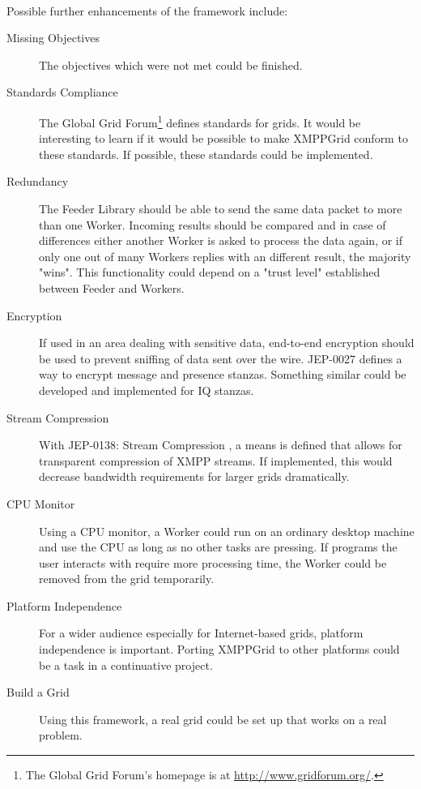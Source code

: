 \paragraph{}
Possible further enhancements of the framework include:
\begin{description}
\item[Missing Objectives] The objectives which were not met could be finished.
\item[Standards Compliance] The Global Grid Forum\footnote{The Global Grid Forum's homepage is at \href{http://www.gridforum.org/}{http://www.gridforum.org/}.} defines standards for grids. It would be interesting to learn if it would be possible to make XMPPGrid conform to these standards. If possible, these standards could be implemented.
\item[Redundancy] The Feeder Library should be able to send the same data packet to more than one Worker. Incoming results should be compared and in case of differences either another Worker is asked to process the data again, or if only one out of many Workers replies with an different result, the majority "wins". This functionality could depend on a "trust level" established between Feeder and Workers.
\item[Encryption] If used in an area dealing with sensitive data, end-to-end encryption should be used to prevent sniffing of data sent over the wire. JEP-0027 \cite{jep0027} defines a way to encrypt message and presence stanzas. Something similar could be developed and implemented for IQ stanzas.
\item[Stream Compression] With JEP-0138: Stream Compression \cite{jep0138}, a means is defined that allows for transparent compression of XMPP streams. If implemented, this would decrease bandwidth requirements for larger grids dramatically.
\item[CPU Monitor] Using a CPU monitor, a Worker could run on an ordinary desktop machine and use the CPU as long as no other tasks are pressing. If programs the user interacts with require more processing time, the Worker could be removed from the grid temporarily.
\item[Platform Independence] For a wider audience especially for Internet-based grids, platform independence is important. Porting XMPPGrid to other platforms could be a task in a continuative project.
\item[Build a Grid] Using this framework, a real grid could be set up that works on a real problem.
\end{description}

